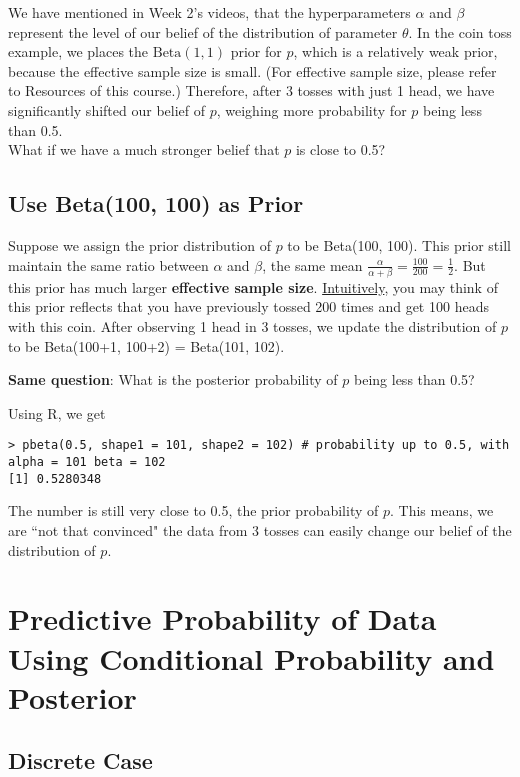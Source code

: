 \documentclass{article}
\def\dsst{\displaystyle}
\begin{document}
We have mentioned in Week 2's videos, that the hyperparameters $\alpha$ and $\beta$ represent the level of our belief of the distribution of parameter $\theta$. In the coin toss example, we places the $\text{Beta}(1, 1)$ prior for $p$, which is a relatively weak prior, because the effective sample size is small. (For effective sample size, please refer to Resources of this course.) Therefore, after 3 tosses with just 1 head, we have significantly shifted our belief of $p$, weighing more probability for $p$ being less than 0.5. \\

What if we have a much stronger belief that $p$ is close to 0.5?

\subsection{Use Beta(100, 100) as Prior}

Suppose we assign the prior distribution of $p$ to be Beta(100, 100). This prior still maintain the same ratio between $\alpha$ and $\beta$, the same mean $\dsst \frac{\alpha}{\alpha+\beta} = \frac{100}{200} = \frac{1}{2}$. But this prior has much larger \textbf{effective sample size}. \underline{Intuitively}, you may think of this prior reflects that you have previously tossed 200 times and get 100 heads with this coin. After observing 1 head in 3 tosses, we update the distribution of $p$ to be Beta(100+1, 100+2) = Beta(101, 102). 
\begin{displayquote}
	\textbf{Same question}: What is the posterior probability of $p$ being less than 0.5? 
\end{displayquote}

Using R, we get
\begin{lstlisting}
> pbeta(0.5, shape1 = 101, shape2 = 102) # probability up to 0.5, with alpha = 101 beta = 102
[1] 0.5280348
\end{lstlisting}

The number is still very close to 0.5, the prior probability of $p$. This means, we are ``not that convinced" the data from 3 tosses can easily change our belief of the distribution of $p$. 

\section{Predictive Probability of Data Using Conditional Probability and Posterior}

\subsection{Discrete Case}
\end{document}
